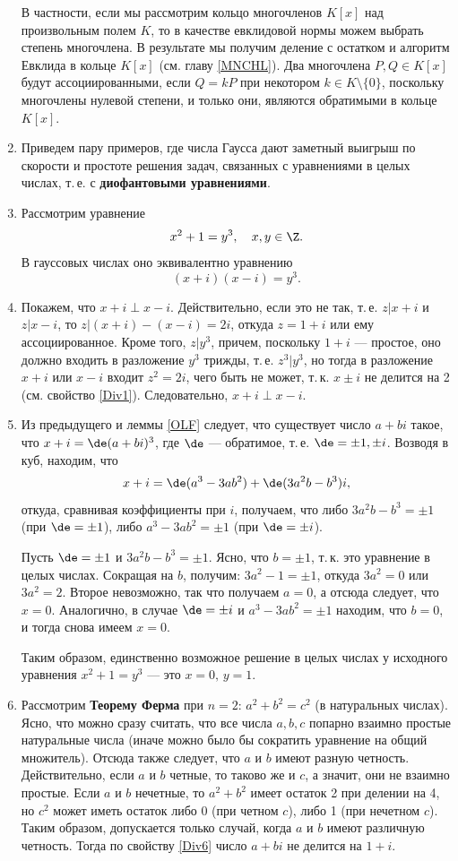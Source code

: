 \begin{enumerate}
В частности, если мы рассмотрим кольцо многочленов $K[x]$ над произвольным полем $K$, то в качестве евклидовой нормы можем выбрать степень многочлена. В результате мы получим деление с остатком и алгоритм Евклида в кольце $K[x]$ (см. главу \ref{MNCHL}). Два многочлена $P,Q\in K[x]$ будут ассоциированными, если $Q=kP$ при некотором $k\in K\setminus\{0\}$, поскольку многочлены нулевой степени, и только они, являются обратимыми в кольце $K[x]$.

\item Приведем пару примеров, где числа Гаусса дают заметный выигрыш по скорости и простоте решения задач, связанных с уравнениями в целых числах, т.\,е. с \textbf{диофантовыми уравнениями}.
\item Рассмотрим уравнение $$x^2+1=y^3,\quad x,y\in\Z.$$
В гауссовых числах оно эквивалентно уравнению $$(x+i)(x-i)=y^3.$$

\item Покажем, что $x+i\perp x-i$. Действительно, если это не так, т.\,е. $z|x+i$ и $z|x-i$, то $z|(x+i)-(x-i)=2i$, откуда $z=1+i$ или ему ассоциированное. Кроме того, $z|y^3$, причем, поскольку $1+i$ --- простое, оно должно входить в разложение $y^3$ трижды, т.\,е. $z^3|y^3$, но тогда в разложение $x+i$ или $x-i$ входит $z^2=2i$, чего быть не может, т.\,к. $x\pm i$ не делится на 2 (см. свойство \ref{Div1}). Следовательно, $x+i\perp x-i$.

\item Из предыдущего и леммы \ref{OLF} следует, что существует число $a+bi$ такое, что $x+i=\de(a+bi)^3$, где $\de$ --- обратимое, т.\,е. $\de=\pm 1,\pm i$. Возводя в куб, находим, что
$$
x+i = \de(a^3-3ab^2) + \de(3a^2b-b^3)i,
$$
откуда, сравнивая коэффициенты при $i$, получаем, что либо $3a^2b-b^3=\pm 1$ (при $\de=\pm 1$), либо $a^3-3ab^2=\pm 1$ (при $\de=\pm i$).

Пусть $\de=\pm1$ и $3a^2b-b^3=\pm 1$. Ясно, что $b=\pm 1$, т.\,к. это уравнение в целых числах. Сокращая на $b$, получим: $3a^2-1=\pm 1$, откуда $3a^2=0$ или $3a^2=2$. Второе невозможно, так что получаем $a=0$, а отсюда следует, что $x=0$. Аналогично, в случае $\de=\pm i$ и $a^3-3ab^2=\pm 1$ находим, что $b=0$, и тогда снова имеем $x=0$.

Таким образом, единственно возможное решение в целых числах у исходного уравнения $x^2+1=y^3$ --- это $x=0,\, y=1$.

\item Рассмотрим \textbf{Теорему Ферма} при $n=2$: $a^2+b^2=c^2$ (в натуральных числах). Ясно, что можно сразу считать, что все числа $a,b,c$ попарно взаимно простые натуральные числа (иначе можно было бы сократить уравнение на общий множитель). Отсюда также следует, что $a$ и $b$ имеют разную четность. Действительно, если $a$ и $b$ четные, то таково же и $c$, а значит, они не взаимно простые. Если $a$ и $b$ нечетные, то $a^2+b^2$ имеет остаток 2 при делении на 4, но $c^2$ может иметь остаток либо 0 (при четном $c$), либо 1 (при нечетном $c$). Таким образом, допускается только случай, когда $a$ и $b$ имеют различную четность. Тогда по свойству \ref{Div6} число $a+bi$ не делится на $1+i$.


\end{enumerate}

